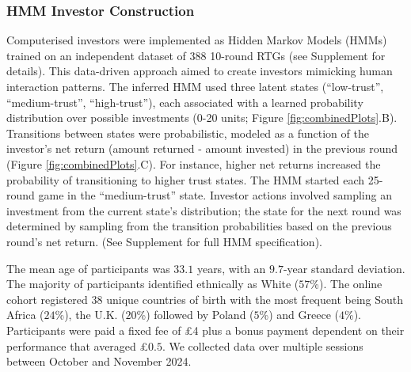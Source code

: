 \documentclass[
]{article}
\begin{document}
\subsubsection{HMM Investor Construction}\label{hmm-investor-construction}

Computerised investors were implemented as Hidden Markov Models (HMMs) trained on an independent dataset of 388 10-round RTGs (see Supplement for details). This data-driven approach aimed to create investors mimicking human interaction patterns. The inferred HMM used three latent states (``low-trust'', ``medium-trust'', ``high-trust''), each associated with a learned probability distribution over possible investments (0-20 units; Figure \ref{fig:combinedPlots}.B). Transitions between states were probabilistic, modeled as a function of the investor's net return (amount returned - amount invested) in the previous round (Figure \ref{fig:combinedPlots}.C). For instance, higher net returns increased the probability of transitioning to higher trust states. The HMM started each 25-round game in the ``medium-trust'' state. Investor actions involved sampling an investment from the current state's distribution; the state for the next round was determined by sampling from the transition probabilities based on the previous round's net return. (See Supplement for full HMM specification).

The mean age of participants was \(33.1\) years, with an \(9.7\)-year standard deviation. The majority of participants identified ethnically as White (\(57\)\%). The online cohort registered \(38\) unique countries of birth with the most frequent being South Africa (\(24\)\%), the U.K. (\(20\)\%) followed by Poland (\(5\)\%) and Greece (\(4\)\%). Participants were paid a fixed fee of £4 plus a bonus payment dependent on their performance that averaged £\(0.5\). We collected data over multiple sessions between October and November 2024.
\end{document}
